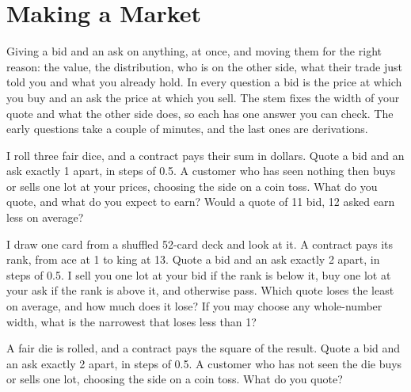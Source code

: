 \chapter{Making a Market}\label{ch:iv2:making-a-market}

\begin{ivtrains}
Giving a bid and an ask on anything, at once, and moving them for the right reason: the value, the distribution, who is on the other side, what their trade just told you and what you already hold. In every question a bid is the price at which you buy and an ask the price at which you sell. The stem fixes the width of your quote and what the other side does, so each has one answer you can check. The early questions take a couple of minutes, and the last ones are derivations.
\end{ivtrains}

\begin{question}\label{iq:iv2:making-a-market:1}
I roll three fair dice, and a contract pays their sum in dollars. Quote a bid and an ask exactly 1 apart, in steps of 0.5. A customer who has seen nothing then buys or sells one lot at your prices, choosing the side on a coin toss. What do you quote, and what do you expect to earn? Would a quote of 11 bid, 12 asked earn less on average?
\end{question}

\begin{question}\label{iq:iv2:making-a-market:2}
I draw one card from a shuffled 52-card deck and look at it. A contract pays its rank, from ace at 1 to king at 13. Quote a bid and an ask exactly 2 apart, in steps of 0.5. I sell you one lot at your bid if the rank is below it, buy one lot at your ask if the rank is above it, and otherwise pass. Which quote loses the least on average, and how much does it lose? If you may choose any whole-number width, what is the narrowest that loses less than 1?
\end{question}

\begin{question}\label{iq:iv2:making-a-market:3}
A fair die is rolled, and a contract pays the square of the result. Quote a bid and an ask exactly 2 apart, in steps of 0.5. A customer who has not seen the die buys or sells one lot, choosing the side on a coin toss. What do you quote?
\end{question}

